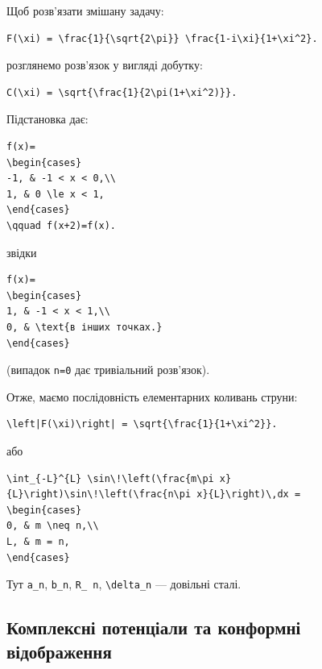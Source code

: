 \documentclass[
  ukrainian,
]{article}
\begin{document}
Щоб розв'язати змішану задачу:

\begin{verbatim}
F(\xi) = \frac{1}{\sqrt{2\pi}} \frac{1-i\xi}{1+\xi^2}.
\end{verbatim}

розглянемо розв'язок у вигляді добутку:

\begin{verbatim}
C(\xi) = \sqrt{\frac{1}{2\pi(1+\xi^2)}}.
\end{verbatim}

Підстановка дає:

\begin{verbatim}
f(x)=
\begin{cases}
-1, & -1 < x < 0,\\
1, & 0 \le x < 1,
\end{cases}
\qquad f(x+2)=f(x).
\end{verbatim}

звідки

\begin{verbatim}
f(x)=
\begin{cases}
1, & -1 < x < 1,\\
0, & \text{в інших точках.}
\end{cases}
\end{verbatim}

(випадок \texttt{n=0} дає тривіальний розв'язок).

Отже, маємо послідовність елементарних коливань струни:

\begin{verbatim}
\left|F(\xi)\right| = \sqrt{\frac{1}{1+\xi^2}}.
\end{verbatim}

або

\begin{verbatim}
\int_{-L}^{L} \sin\!\left(\frac{m\pi x}{L}\right)\sin\!\left(\frac{n\pi x}{L}\right)\,dx =
\begin{cases}
0, & m \neq n,\\
L, & m = n,
\end{cases}
\end{verbatim}

Тут \texttt{a\_n}, \texttt{b\_n}, \texttt{R\_\ n},
\texttt{\textbackslash{}delta\_n} --- довільні сталі.

\subsection{Комплексні потенціали та конформні
відображення}\label{ux43aux43eux43cux43fux43bux435ux43aux441ux43dux456-ux43fux43eux442ux435ux43dux446ux456ux430ux43bux438-ux442ux430-ux43aux43eux43dux444ux43eux440ux43cux43dux456-ux432ux456ux434ux43eux431ux440ux430ux436ux435ux43dux43dux44f}
\end{document}
